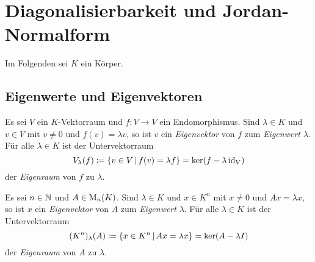\section{Diagonalisierbarkeit und Jordan-Normalform}

Im Folgenden sei $K$ ein Körper.





\subsection{Eigenwerte und Eigenvektoren}


\begin{definition}
  Es sei $V$ ein $K$-Vektorraum und $f \colon V \to V$ ein Endomorphismus.
  Sind $\lambda \in K$ und $v \in V$ mit $v \neq 0$ und $f(v) = \lambda v$, so ist $v$ ein \emph{Eigenvektor} von $f$ zum \emph{Eigenwert} $\lambda$.
  Für alle $\lambda \in K$ ist der Untervektorraum
  \[
              V_{\lambda}(f)
    \coloneqq \{ v \in V \,|\, f(v) = \lambda f \}
    =         \ker (f - \lambda \operatorname{id}_V)
  \]
  der \emph{Eigenraum} von $f$ zu $\lambda$.

  Es sei $n \in \mathbb{N}$ und $A \in \operatorname{M}_{n}(K)$.
  Sind $\lambda \in K$ und $x \in K^n$ mit $x \neq 0$ und $Ax = \lambda x$, so ist $x$ ein \emph{Eigenvektor} von $A$ zum \emph{Eigenwert} $\lambda$.
  Für alle $\lambda \in K$ ist der Untervektorraum
  \[
              (K^n)_{\lambda}(A)
    \coloneqq \{ x \in K^n \,|\, Ax = \lambda x \}
    =         \ker (A - \lambda I)
  \]
  der \emph{Eigenraum} von $A$ zu $\lambda$.
\end{definition}


